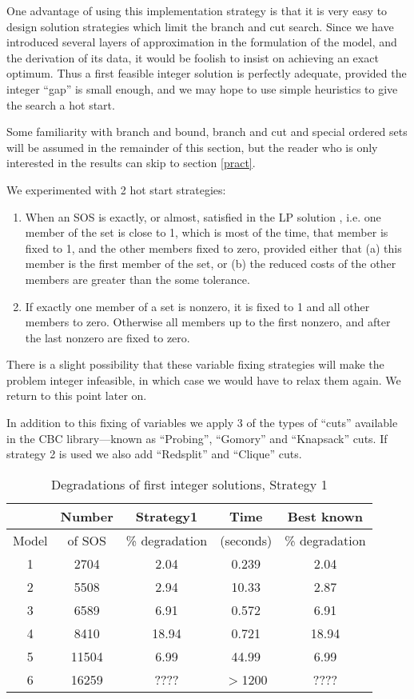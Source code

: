 \documentclass[finalversion,simpleeqnnos]{yrl}
\begin{document}
One advantage of using this implementation strategy is that it is very easy to design solution strategies which limit the branch and cut search. Since we have introduced several layers of approximation in the formulation of the model, and the derivation of its data, it would be foolish to insist on achieving an exact optimum. Thus a first feasible integer solution is perfectly adequate, provided the integer ``gap'' is small enough, and we may hope to use simple heuristics to give the search a hot start. 

Some familiarity with branch and bound, branch and cut and special ordered sets will be assumed in the remainder of this section, but the reader who is only interested in the results can skip to section \ref{pract}.

We experimented with 2 hot start strategies:
\begin{enumerate}
\item When an SOS is exactly, or almost, satisfied in the LP solution , i.e. one member of the set is close to 1, which is most of the time, that member is fixed to 1, and the other members fixed to zero, provided either that (a) this member is the first member of the set, or (b) the reduced costs of the other members are greater than the some tolerance.
\item If exactly one member of a set is nonzero, it is fixed to 1 and all other members to zero. Otherwise all members up to the first nonzero, and after the last nonzero are fixed to zero.
\end{enumerate} 
There is a slight possibility that these variable fixing strategies will make the problem integer infeasible, in which case we would have to relax them again. We return to this point later on.

In addition to this fixing of variables we apply 3 of the types of ``cuts'' available in the CBC library---known as ``Probing'', ``Gomory'' and ``Knapsack'' cuts. If strategy 2 is used we also add ``Redsplit'' and ``Clique'' cuts.

\begin{table}[htbp]
\begin{centering}
\begin{tabular}{|| c | c | c | c | c ||}
\hline
 & Number & Strategy1 & Time & Best known \\ \hline
Model & of SOS &\% degradation & (seconds) & \% degradation \\ \hline
1 & 2704 & 2.04   & 0.239& 2.04 \\ \hline
2 & 5508 & 2.94 & 10.33 & 2.87 \\ \hline 
3 & 6589 & 6.91 & 0.572 & 6.91 \\ \hline 
4 & 8410 & 18.94 & 0.721 & 18.94 \\ \hline 
5 & 11504 & 6.99 & 44.99 & 6.99 \\ \hline 
6 & 16259 & ???? & $>$1200 & ???? \\ \hline 
\end{tabular}
\caption{Degradations of first integer solutions, Strategy 1}
\label{strat1}
\end{centering}
\end{table}
\end{document}
